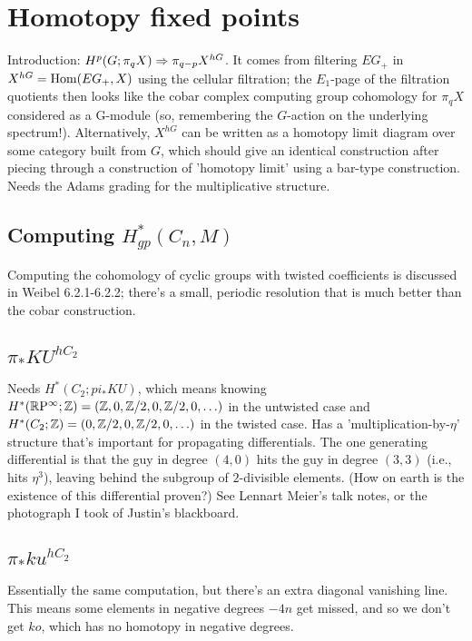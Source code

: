 \chapter{Homotopy fixed points}

Introduction: $H^p(G; \pi_q X) \Rightarrow \pi_{q-p} X^{hG}$. It comes from filtering $EG_+$ in $X^{hG} = \operatorname{Hom}(EG_+, X)$ using the cellular filtration; the $E_1$-page of the filtration quotients then looks like the cobar complex computing group cohomology for $\pi_q X$ considered as a G-module (so, remembering the $G$-action on the underlying spectrum!).  Alternatively, $X^{hG}$ can be written as a homotopy limit diagram over some category built from $G$, which should give an identical construction after piecing through a construction of 'homotopy limit' using a bar-type construction.  Needs the Adams grading for the multiplicative structure.

\section{Computing $H^*_{gp}(C_n, M)$}

Computing the cohomology of cyclic groups with twisted coefficients is discussed in Weibel 6.2.1-6.2.2; there's a small, periodic resolution that is much better than the cobar construction.

\section{$\pi_* KU^{hC_2}$}

Needs $H^*(C_2; pi_* KU)$, which means knowing $H^*(\mathbb{R}\mathrm{P}^\infty; \mathbb{Z}) = (\mathbb{Z}, 0, \mathbb{Z}/2, 0, \mathbb{Z}/2, 0, \ldots)$ in the untwisted case and $H^*(C_2; \mathbb{Z}) = (0, \mathbb{Z}/2, 0, \mathbb{Z}/2, 0, \ldots)$ in the twisted case.  Has a 'multiplication-by-$\eta$' structure that's important for propagating differentials.  The one generating differential is that the guy in degree $(4, 0)$ hits the guy in degree $(3, 3)$ (i.e., hits $\eta^3$), leaving behind the subgroup of $2$-divisible elements.  (How on earth is the existence of this differential proven?)  See Lennart Meier's talk notes, or the photograph I took of Justin's blackboard.

\section{$\pi_* ku^{hC_2}$}

Essentially the same computation, but there's an extra diagonal vanishing line.  This means some elements in negative degrees $-4n$ get missed, and so we don't get $ko$, which has no homotopy in negative degrees.


